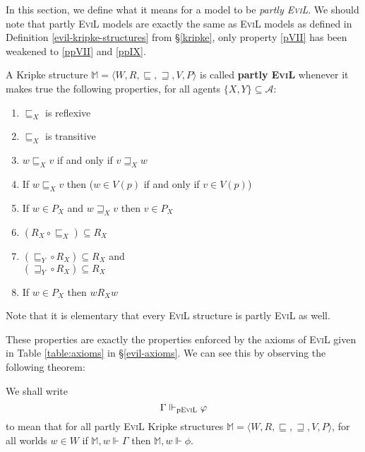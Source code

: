 In this section, we define what it means for a model to be
\emph{partly \textsc{EviL}}.  We should note that partly \textsc{EviL}
models are exactly the same as \textsc{EviL} models as defined in Definition
  \ref{evil-kripke-structures} from \S\ref{kripke}, only property
  \ref{pVII} has been weakened to \ref{ppVII} and \ref{ppIX}.

\begin{definition}\label{partly-evil}
A Kripke structure $\mathbb{M}=\langle W, R, \sqsubseteq, \sqsupseteq, V, P \rangle$ is called \textbf{partly
  \textsc{EviL}} whenever it makes true the following properties, for
all agents $\{X,Y\} \subseteq \mathcal{A}$:
  \begin{enumerate}[label=\textup{(\emph{\Roman*})$'$}, topsep=0.0in, parsep=0.075in]
    \item\label{ppI} $\sqsubseteq_X$ is reflexive
    \item \label{pptrans} $\sqsubseteq_X$ is transitive 
    \item \label{ppreverse} $w \sqsubseteq_X v$ if and only if $v
    \sqsupseteq_X w$
    \item \label{islandiff} If $w \sqsubseteq_X v$ then ($w \in V (p)$ if and only if $v
    \in V (p)$)
    \item\label{ppIX} If $w \in P_X$ and $w \sqsupseteq_X v$ then $v
    \in P_X$
    \item \label{ppV} $(R_X \circ \sqsubseteq_X) \subseteq R_X$
    \item \label{ppVI} 
    $(\sqsubseteq_Y \circ R_X) \subseteq R_X$ and \\
    $(\sqsupseteq_Y \circ R_X) \subseteq R_X$
    \item\label{ppVII} If $w \in P_X$ then $w
    R_X w$
  \end{enumerate}
\end{definition}

Note that it is elementary that every \textsc{EviL} structure is
partly \textsc{EviL} as well.

These properties are exactly the properties enforced
by the axioms of \textsc{EviL} given in Table \ref{table:axioms} in
\S\ref{evil-axioms}. We can see this by observing the following
theorem:

\begin{definition}\label{pEviL-Vdash}
We shall write
\[ \Gamma \Vdash_{\textup{p\textsc{EviL}}} \phi \]
to mean that for all partly \textsc{EviL} Kripke structures
$\mathbb{M} = \langle W, R, \sqsubseteq, \sqsupseteq, V, P \rangle$,
for all worlds $w \in W$ if $\mathbb{M},w \Vdash \Gamma$ then $\mathbb{M},w \Vdash \phi$.
\end{definition}

